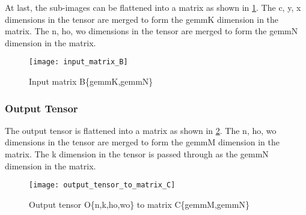 At last, the sub-images can be flattened into a matrix as shown in
\Fig \ref{fig:input_matrix_B}.
The c, y, x dimensions in the tensor are merged to form the gemmK dimension
in the matrix.
The n, ho, wo dimensions in the tensor are merged to form the gemmN
dimension in the matrix.
{}
\begin{figure}[!h]
  \centering
  \texttt{[image: input\_matrix\_B]}
  \caption{Input matrix B\{gemmK,gemmN\}}
  \label{fig:input_matrix_B}
\end{figure}


\subsubsection{Output Tensor}

The output tensor is flattened into a matrix as shown in
\Fig \ref{fig:output_tensor_to_matrix_C}.
The n, ho, wo dimensions in the tensor are merged to form the gemmM dimension
in the matrix.
The k dimension in the tensor is passed through as the gemmN dimension in
the matrix.

{}
\begin{figure}[!h]
  \centering
  \texttt{[image: output\_tensor\_to\_matrix\_C]}

  \caption{Output tensor O\{n,k,ho,wo\} to matrix C\{gemmM,gemmN\}}
  \label{fig:output_tensor_to_matrix_C}
\end{figure}


    
